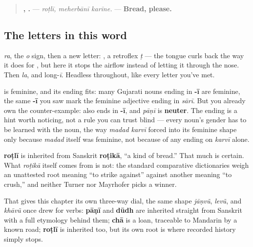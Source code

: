 \begin{quote}
\textbf{,  .} — \emph{roṭlī, meherbānī karīne.} — \textbf{Bread, please.}
\end{quote}

\subsection*{The letters in this word}
\textbf{} \emph{ra}, \textbf{} the \emph{o} sign, then a new letter: \textbf{}, a retroflex \emph{ṭ} — the tongue curls back the way it does for \textbf{}, but here it stops the airflow instead of letting it through the nose. Then \textbf{} \emph{la}, and \textbf{} long-\emph{ī}. Headless throughout, like every letter you've met.

\begin{grammarlens}[title={Grammar Lens: an -ī that does not mean \textquotedblleft{}feminine, guaranteed\textquotedblright{}}]
\textbf{} is feminine, and its ending fits: many Gujarati nouns ending in \textbf{-ī} are feminine, the same \textbf{-ī} you saw mark the feminine adjective ending in \emph{sārī}. But you already own the counter-example: \textbf{} also ends in \textbf{-ī}, and \emph{pāṇī} is \textbf{neuter}. The ending is a hint worth noticing, not a rule you can trust blind — every noun's gender has to be learned with the noun, the way \emph{madad karvī} forced \textbf{} into its feminine shape only because \emph{madad} itself was feminine, not because of any ending on \emph{karvī} alone.
\end{grammarlens}

\begin{cousinweb}
\textbf{roṭlī} is inherited from Sanskrit \textbf{roṭikā}, \textquotedblleft{}a kind of bread.\textquotedblright{} That much is certain. What \emph{roṭikā} itself comes from is not: the standard comparative dictionaries weigh an unattested root meaning \textquotedblleft{}to strike against\textquotedblright{} against another meaning \textquotedblleft{}to crush,\textquotedblright{} and neither Turner nor Mayrhofer picks a winner.

That gives this chapter its own three-way dial, the same shape \emph{jāṇvũ}, \emph{levũ}, and \emph{khāvũ} once drew for verbs: \textbf{pāṇī} and \textbf{dūdh} are inherited straight from Sanskrit with a full etymology behind them; \textbf{chā} is a loan, traceable to Mandarin by a known road; \textbf{roṭlī} is inherited too, but its own root is where recorded history simply stops.
\end{cousinweb}

